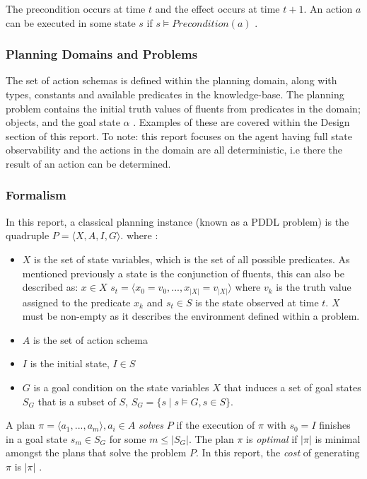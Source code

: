 \noindent The precondition occurs at time $t$ and the effect occurs at time $t+1$. An action $a$ can be executed in some state $s$ if $s \models Precondition(a)$ \cite[Chapter 10]{russell2016artificial}. 

\subsubsection{Planning Domains and Problems}
The set of action schemas is defined within the planning domain, along with types, constants and available predicates in the knowledge-base. The planning problem contains the initial truth values of fluents from predicates in the domain; objects, and the goal state $\alpha$ \cite{ghallab_pddl_1998}. Examples of these are covered within the Design section of this report. To note: this report focuses on the agent having full state observability and the actions in the domain are all deterministic, i.e there the result of an action can be determined.

\subsubsection{Formalism}
In this report, a classical planning instance (known as a PDDL problem) is the quadruple $P = \langle X, A, I, G \rangle$. where \cite{segovia-aguas_generalized_2021}:
\begin{itemize}
    \item $X$ is the set of state variables, which is the set of all possible predicates. As mentioned previously a state is the conjunction of fluents, this can also be described as: $x \in X$ $s_t = \langle x_0 = v_0, ..., x_{|X|} = v_{|X|} \rangle$ where $v_k$ is the truth value assigned to the predicate $x_k$ and $s_t \in S$ is the state observed at time $t$. $X$ must be non-empty as it describes the environment defined within a problem.
    \item $A$ is the set of action schema
    \item $I$ is the initial state, $I \in S$ 
    \item $G$ is a goal condition on the state variables $X$ that induces a set of goal states $S_G$ that is a subset of $S$, $S_G = \{s \mid s \models G, s \in S\}$.
\end{itemize}

\noindent A plan $\pi = \langle a_1, ..., a_m \rangle, a_i \in A$ \textit{solves} $P$ if the execution of $\pi$ with $s_0 = I$ finishes in a goal state $s_m \in S_G$ for some $m \leq |S_G|$. The plan $\pi$ is \textit{optimal} if $|\pi|$ is minimal amongst the plans that solve the problem $P$. In this report, the \textit{cost} of generating $\pi$ is $|\pi|$ \cite{segovia-aguas_generalized_2021}.

